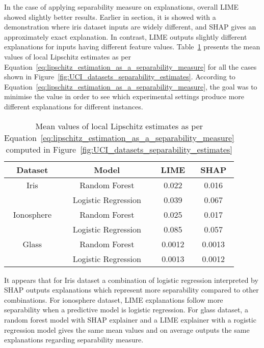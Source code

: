 \documentclass[english]{tktltiki2}
\theoremstyle{definition}
\theoremstyle{remark}
\begin{document}
In the case of applying separability measure on explanations, overall LIME showed slightly better results. Earlier in section, it is showed with a demonstration where iris dataset inputs are widely different, and SHAP gives an approximately exact explanation. In contrast, LIME outputs slightly different explanations for inputs having different feature values. Table~\ref{table:lipschitz_estimation_separability_aggregated_datasets_UCI} presents the mean values of local Lipschitz estimates as per Equation~\eqref{eq:lipschitz_estimation_as_a_separability_measure} for all the cases shown in Figure~\ref{fig:UCI_datasets_separability_estimates}. According to Equation~\eqref{eq:lipschitz_estimation_as_a_separability_measure}, the goal was to minimise the value in order to see which experimental settings produce more different explanations for different instances.

\begin{table}[H]
	\caption{Mean values of local Lipschitz estimates as per Equation~\eqref{eq:lipschitz_estimation_as_a_separability_measure} computed in Figure~\ref{fig:UCI_datasets_separability_estimates}}
	\label{table:lipschitz_estimation_separability_aggregated_datasets_UCI}
	\begin{center}
		\begin{tabular}{|c|c|c|c|}
			\hline
			\textbf{Dataset} & \textbf{Model} & \textbf{LIME} & \textbf{SHAP} \\ \hline
			
			Iris & Random Forest & 0.022 & 0.016  \\ \hline
			& Logistic Regression & 0.039 & 0.067 \\ \hline
			
			Ionosphere & Random Forest & 0.025 & 0.017 \\ \hline
			& Logistic Regression & 0.085 & 0.057 \\ \hline
			
			Glass & Random Forest & 0.0012 & 0.0013 \\ \hline
			& Logistic Regression & 0.0013 & 0.0012 \\ \hline
			
		\end{tabular}
	\end{center}
\end{table}

It appears that for Iris dataset a combination of logistic regression interpreted by SHAP outputs explanations which represent more separability compared to other combinations. For ionosphere dataset, LIME explanations follow more separability when a predictive model is logistic regression. For glass dataset, a random forest model with SHAP explainer and a LIME explainer with a rogistic regression model gives the same mean values and on average outputs the same explanations regarding separability measure.
\end{document}
